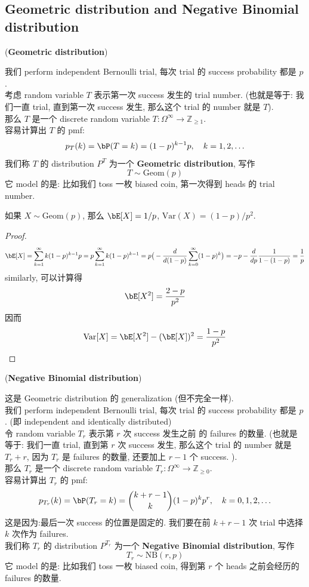 \subsection{Geometric distribution and Negative Binomial distribution}
\begin{example}{(\textbf{Geometric distribution})}

我们 perform independent Bernoulli trial, 每次 trial 的 success probability 都是 \(p\).\\
考虑 random variable \(T\) 表示第一次 success 发生的 trial number. (也就是等于: 我们一直 trial, 直到第一次 success 发生, 那么这个 trial 的 number 就是 \(T\)).\\
那么 \(T\) 是一个 discrete random variable \(T: \Omega^\infty \to \mathbb{Z}_{\geq 1}\).\\
容易计算出 \(T\) 的 pmf:
\[
p_T(k) = \bP(T = k) = (1-p)^{k-1} p, \quad k = 1,2,\ldots
\]
我们称 \(T\) 的 distribution \(P^T\) 为一个 \textbf{Geometric distribution}, 写作
\[
T \sim \text{Geom}(p)
\]
它 model 的是: 比如我们 toss 一枚 biased coin, 
第一次得到 heads 的 trial number.\\
\end{example}
\begin{proposition}
    如果 \(X \sim \text{Geom}(p)\), 那么 \(\bE[X] = 1/p\),
     \(\text{Var}(X) = (1-p)/p^2\).
\end{proposition}
\begin{proof}
    \[
    \bE[X] = \sum_{k=1}^\infty k(1-p)^{k-1}p = p\sum_{k=1}^\infty k(1-p)^{k-1} = 
    p \big( -\frac{d}{d(1-p)} \sum_{k=0}^\infty (1-p)^k \big) = 
    -p -\frac{d}{dp} \frac{1}{1-(1-p)}  = \frac{1}{p}
    \]
    similarly, 可以计算得\[
    \bE[X^2] =\frac{2-p}{p^2}
    \]
    因而 \[
    \text{Var}[X] = \bE[X^2] - (\bE[X])^2 = \frac{1-p}{p^2}
    \]
\end{proof}


\begin{example}{(\textbf{Negative Binomial distribution})}

这是 Geometric distribution 的 generalization (但不完全一样).\\
我们 perform independent Bernoulli trial, 
每次 trial 的 success probability 都是 \(p\). (即 independent and identically distributed)\\
令 random variable \(T_r\) 表示第 \(r\) 次 success 发生之前
的 failures 的数量.
 (也就是等于: 我们一直 trial, 直到第
\(r\) 次 success 发生, 那么这个 trial 的 number 就是 \(T_r + r\), 
因为 \(T_r\) 是 failures 的数量, 还要加上 \(r-1\) 个 success.
).\\
那么 \(T_r\) 是一个 discrete random variable 
\(T_r: \Omega^\infty \to \mathbb{Z}_{\geq 0}\).\\
容易计算出 \(T_r\) 的 pmf:
\[
p_{T_r}(k) = \bP(T_r = k) = 
\binom{k+r-1}{k}  (1-p)^{k} p^r, \quad k = 0, 1, 2, \ldots
\]
这是因为:最后一次 success 的位置是固定的. 我们要在前 \(k+r-1\) 次 trial 
中选择 \(k\) 次作为 failures.\\
我们称 \(T_r\) 的 distribution \(P^{T_r}\) 为一个 \textbf{Negative Binomial distribution}, 写作
\[
T_r \sim \text{NB}(r,p)
\]  
它 model 的是: 比如我们 toss 一枚 biased coin,
得到第 \(r\) 个 heads 之前会经历的 failures 的数量.\\
\end{example}


